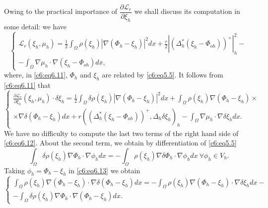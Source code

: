 Owing to the practical importance of $\dfrac{\partial 
\mathscr{L}_r}{\partial \xi_h}$ we shall discuss its computation in 
some detail: we have   
\begin{equation}
\begin{cases}
\mathscr{L}_r (\xi_h , \mu_h) = \frac{1}{2} \int_\Omega \rho (\xi_h)| 
\nabla (\Phi_h - \xi_h) |^2 dx + \frac{r}{2}| (\Delta^*_h (\xi_h 
- \Phi_{oh}))^+ |^2_h-\\  
- \int_\Omega \nabla \mu_h \cdot \nabla (\xi_h- \Phi_{oh})dx,
\end{cases}
\tag{6.11}\label{c6:eq6.11} 
\end{equation}
where, in \eqref{c6:eq6.11}, $\Phi_h$ and $\xi_h$ are related by 
\eqref{c6:eq5.5}. It follows from \eqref{c6:eq6.11} that  
{\fontsize{10}{12}\selectfont
\begin{equation}
\begin{cases}
\frac{\partial \mathscr{L}_r}{\partial \xi_h} (\xi_h, \mu_h) \cdot 
\delta \xi_h = \frac{1}{2} \int_\Omega \delta \rho (\xi_h) 
|\nabla (\Phi_h- \xi_h)|^2 dx + \int_\Omega \rho (\xi_h) 
\nabla (\Phi_h - \xi_h) \times\\   
\times \nabla \delta (\Phi_h - \xi_h) dx + r ((\Delta^*_h(\xi_h 
- \Phi_{oh}))^+, \Delta_h \delta \xi_h)_h - \int_\Omega \nabla 
\mu_h \cdot \nabla \delta \xi_h dx.  
\end{cases}
\tag{6.12}\label{c6:eq6.12}
\end{equation}}
We have no difficulty to compute the last two terms of the right hand 
side of \eqref{c6:eq6.12}. About the second term, we obtain by 
differentiation of \eqref{c6:eq5.5}  
\begin{equation}
\int_\Omega \delta \rho (\xi_h) \nabla \Phi_h \cdot 
\nabla \phi_h dx = - \int_\Omega \rho (\xi_h) \nabla 
\delta \Phi_h \cdot \nabla \phi_h dx ~ \forall \phi_h \in 
V_h. \tag{6.13}\label{c6:eq6.13}   
\end{equation}
Taking $\phi_h = \Phi_h - \xi_h$ in \eqref{c6:eq6.13} we obtain  
{\fontsize{10}{12}\selectfont
\begin{equation}
\begin{cases}
\int_\Omega \rho (\xi_h) \nabla (\Phi_h - \xi_h) \cdot 
\nabla \delta (\Phi_h - \xi_h) dx = - \int_\Omega \rho (\xi_h) 
\nabla (\Phi_h - \xi_h) \cdot \nabla \delta \xi_h dx-\\  
-\int_\Omega \delta \rho (\xi_h) \nabla \Phi_h \cdot 
\nabla (\Phi_h - \xi_h) dx.  
\end{cases}
\tag{6.14}\label{c6:eq6.14}
\end{equation}}
